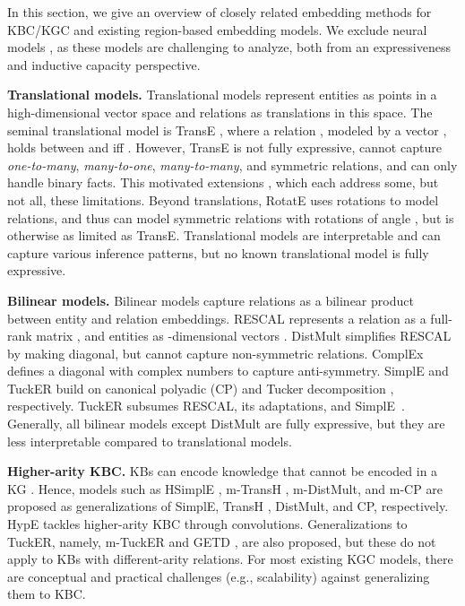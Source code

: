 \documentclass{article}
\begin{document}
In this section, we give an overview of closely related embedding methods for KBC/KGC  and existing region-based embedding models. We exclude neural models \cite{ConvE-AAAI18,EMLP-NIPS13,KBGAT-ACL19}, as these models are challenging to analyze, both from an expressiveness and inductive capacity perspective. 

\textbf{Translational models.} Translational models represent entities as points in a high-dimensional vector space and relations as translations in this space. The seminal translational model is TransE \cite{TransE-NIPS13}, where a relation , modeled by a vector , holds between  and  iff . However, TransE is not fully expressive, cannot capture \emph{one-to-many}, \emph{many-to-one},  \emph{many-to-many}, and symmetric relations, and can only handle binary facts. 
This motivated extensions \cite{TransH-AAAI14, TransR-AAAI15,TranSparse-AAAI16,TransF-KR16}, which each address some, but not all,  these limitations. 
Beyond translations, RotatE \cite{RotatE-ICLR19} uses rotations to model relations, and thus can model symmetric relations with rotations of angle , but is otherwise as limited as TransE. 
Translational models are interpretable and can capture various inference patterns, but no known translational model is fully expressive. 


\textbf{Bilinear models.} Bilinear models capture relations as a bilinear product between entity and relation embeddings. RESCAL \cite{RESCAL-ICML11} represents a relation  as a full-rank  matrix , and entities as -dimensional vectors . DistMult \cite{DistMult-ICLR15} simplifies RESCAL by making  diagonal, but cannot capture non-symmetric relations.
ComplEx \cite{ComplEx-ICML16} defines a diagonal  with complex numbers to capture anti-symmetry. SimplE \cite{SimplE-NeurIPS18} and TuckER \cite{TuckER} build on canonical polyadic (CP) \cite{hitchcock1927expression} and Tucker decomposition \cite{tucker1966some}, respectively. TuckER subsumes RESCAL, its adaptations, and SimplE~\cite{TuckER}. 
Generally, all bilinear models except DistMult are fully expressive, but they are less interpretable compared to translational models.


\textbf{Higher-arity KBC.}
KBs can encode knowledge that cannot be encoded in a KG \cite{Fatemi19}. Hence, models such as HSimplE \cite{Fatemi19}, m-TransH \cite{Wen16}, m-DistMult, and m-CP \cite{Fatemi19} are proposed as generalizations of SimplE, TransH \cite{TransH-AAAI14}, DistMult, and CP, respectively.  HypE \cite{Fatemi19} tackles higher-arity KBC through convolutions. 
Generalizations to TuckER, namely,  m-TuckER and GETD \cite{Liu20}, are also proposed, but these do not apply to KBs with different-arity relations.
For most existing KGC models, there are conceptual and practical challenges (e.g., scalability) against generalizing them to KBC.
\end{document}
